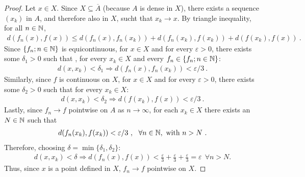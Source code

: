 \begin{questions}


\begin{solution}
  \begin{proof}
Let $x\in X$. Since $X\subseteq\overline{A}$ (because $A$ is dense in $X$), there exists a sequence $(x_k)$ in $A$, and therefore also in $X$, sucht that $x_k\rightarrow x$. By triangle inequality, for all $n\in\mathbb{N}$,
\begin{align*}
d(f_n(x),f(x))\leq d(f_n(x),f_n(x_k))+d(f_n(x_k),f(x_k))+
d(f(x_k),f(x))~.
\end{align*}
Since $\{f_n;n\in\mathbb{N}\}$ is equicontinuous, for $x\in X$ and for every $\varepsilon >0$, there exists some $\delta_1>0$ such that , for every $x_k\in X$ and every $f_n\in\{f_n;n\in\mathbb{N}\}$:
\begin{align*}
d(x,x_k)<\delta_1\Rightarrow d(f_n(x),f_n(x_k))<\varepsilon /3~.
\end{align*}
Similarly, since $f$ is continuous on $X$, for $x\in X$ and for every $\varepsilon >0$, there exists some $\delta _2>0$ such that for every $x_k\in X$:
\begin{align*}
d(x,x_k)<\delta_2\Rightarrow d(f(x_k),f(x))<\varepsilon /3~.
\end{align*}
Lastly, since $f_n\rightarrow f$ pointwise on $A$ as $n\rightarrow\infty$, for each $x_k\in X$ there exists an $N\in\mathbb{N}$ such that
\begin{align*}
d(f_n(x_k),f(x_k))<\varepsilon /3~,~~ \forall n\in\mathbb{N},~\text{with } n>N~.
\end{align*}
Therefore, choosing $\delta =\min\{\delta_1,\delta_2\}$:
\begin{align*}
d(x,x_k)<\delta\Rightarrow d(f_n(x),f(x))< \frac{\varepsilon}{3}+\frac{\varepsilon}{3}+\frac{\varepsilon}{3}=\varepsilon~~\forall n>N.
\end{align*}
Thus, since $x$ is a point defined in $X$, $f_n\rightarrow f$ pointwise on $X$.
  \end{proof}
\end{solution}
\end{questions}